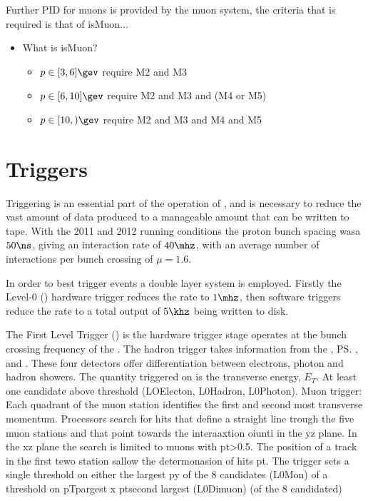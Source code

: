 Further PID for muons is provided by the \lhcb muon system, the criteria that is required is that
of {isMuon}...
\begin{itemize}
  \item What is isMuon?
    \begin{itemize}
      \item $p\in[3,6]\gev$ require M2 and M3
      \item $p\in[6,10]\gev$ require M2 and M3 and (M4 or M5)
      \item $p\in[10,)\gev$ require M2 and M3 and M4 and M5
    \end{itemize}
\end{itemize}





\section{Triggers}
Triggering is an essential part of the operation of \lhcb, and is necessary to reduce the vast
amount of data produced to a manageable amount that can be written to tape.
With the 2011 and 2012 running conditions the proton bunch spacing wasa $50\ns$, giving an
interaction rate of $40\mhz$, with an average number of interactions per bunch crossing of $\mu=1.6$.

In order to best trigger events a double layer system is employed.
Firstly the Level-0 (\lone) hardware trigger reduces the rate to $1\mhz$, then software triggers
reduce the rate to a total output of $5\khz$ being written to disk.

The First Level Trigger (\lone) is the hardware trigger stage operates at the bunch crossing
frequency of the \lhc.
The \lone hadron trigger takes information from the  \spd, \ps, \ecal and \hcal.
These four detectors offer differentiation between electrons, photon and hadron showers.
The quantity triggered on is the transverse energy, $E_T$.
At least one candidate above threshold (LOElecton, L0Hadron, L0Photon).
Muon trigger: Each quadrant of the muon station identifies the first and second most transverse
momentum.
Processors search for hits that define a straight line trough the five muon stations and that point
towards the interaaxtion oiunti in the yz plane.
In the xz plane the search is limited to muons with pt>0.5\gev.
The position of a track in the first tewo station sallow the determonasion of hits pt.
The trigger sets a single threshold on either the largest py of the 8 candidates (L0Mon) of a
threshold on pTpargest x ptsecond largest (L0Dimuon) (of the 8 candidated)




